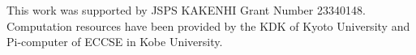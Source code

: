 \documentclass[draft,jgrga]{agutex2015}
\begin{document}
\begin{article}
\begin{acknowledgments}
This work was supported by JSPS KAKENHI Grant Number 23340148. 
Computation resources have been provided by the KDK of Kyoto University
and Pi-computer of ECCSE in Kobe University.
\end{acknowledgments}

%
%
%
%
%
%
%
%
%


%


%
%
%
%


\end{article}
\end{document}
